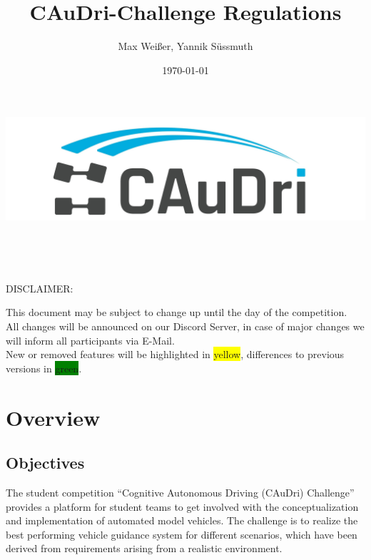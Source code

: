 \documentclass[a4paper]{report}
\title{CAuDri-Challenge Regulations \the\year{}}
\author{Max Weißer, Yannik Süssmuth}
\date{\today}
\begin{document}
\begin{titlepage}
	\makeatletter
	\begin{center}
	\vspace*{3cm}
	
	\includegraphics[width=\textwidth]{graphics/caudri_logo_no_border.jpg}\\
	\vspace{1cm}
	
	\Huge\bfseries\@title\\
	\vspace{\baselineskip}
	
	\Large\@date\\
	\vspace{8cm}

	\large DISCLAIMER:\\
	
	{\raggedright This document may be subject to change up until the day of the competition.\\
	All changes will be announced on our Discord Server, in case of major changes we will inform all participants via E-Mail.\\
	New or removed features will be highlighted in \colorbox{yellow}{yellow}, differences to previous versions in \colorbox{green}{green}.\\}

	\end{center}	
	\makeatother
\end{titlepage}


\tableofcontents


\chapter{Overview} 

\section{Objectives}

The student competition “Cognitive Autonomous Driving (CAuDri) Challenge” provides a platform for student teams to get involved with the conceptualization and implementation of automated model vehicles. The challenge is to realize the best performing vehicle guidance system for different scenarios, which have been derived from requirements arising from a realistic environment. 
\end{document}

